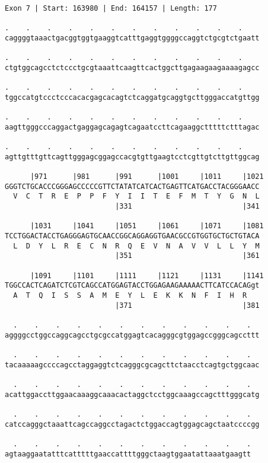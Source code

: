 \documentclass{article}
\begin{document}
\newpage
\begin{Verbatim}[fontfamily=courier]
Exon 7 | Start: 163980 | End: 164157 | Length: 177

.    .    .    .    .    .    .    .    .    .    .    .    
caggggtaaactgacggtggtgaaggtcatttgaggtggggccaggtctgcgtctgaatt

.    .    .    .    .    .    .    .    .    .    .    .    
ctgtggcagcctctccctgcgtaaattcaagttcactggcttgagaagaagaaaagagcc

.    .    .    .    .    .    .    .    .    .    .    .    
tggccatgtccctcccacacgagcacagtctcaggatgcaggtgcttgggaccatgttgg

.    .    .    .    .    .    .    .    .    .    .    .    
aagttgggcccaggactgaggagcagagtcagaatccttcagaaggctttttctttagac

.    .    .    .    .    .    .    .    .    .    .    .    
agttgtttgttcagttgggagcggagccacgtgttgaagtcctcgttgtcttgttggcag

      |971      |981      |991      |1001     |1011     |1021
GGGTCTGCACCCGGGAGCCCCCGTTCTATATCATCACTGAGTTCATGACCTACGGGAACC
  V  C  T  R  E  P  P  F  Y  I  I  T  E  F  M  T  Y  G  N  L
                          |331                          |341

      |1031     |1041     |1051     |1061     |1071     |1081
TCCTGGACTACCTGAGGGAGTGCAACCGGCAGGAGGTGAACGCCGTGGTGCTGCTGTACA
  L  D  Y  L  R  E  C  N  R  Q  E  V  N  A  V  V  L  L  Y  M
                          |351                          |361

      |1091     |1101     |1111     |1121     |1131     |1141
TGGCCACTCAGATCTCGTCAGCCATGGAGTACCTGGAGAAGAAAAACTTCATCCACAGgt
  A  T  Q  I  S  S  A  M  E  Y  L  E  K  K  N  F  I  H  R   
                          |371                          |381

  .    .    .    .    .    .    .    .    .    .    .    .  
aggggcctggccaggcagcctgcgccatggagtcacagggcgtggagccgggcagccttt

  .    .    .    .    .    .    .    .    .    .    .    .  
tacaaaaagccccagcctaggaggtctcagggcgcagcttctaacctcagtgctggcaac

  .    .    .    .    .    .    .    .    .    .    .    .  
acattggaccttggaacaaaggcaaacactaggctcctggcaaagccagctttgggcatg

  .    .    .    .    .    .    .    .    .    .    .    .  
catccagggctaaattcagccaggcctagactctggaccagtggagcagctaatccccgg

  .    .    .    .    .    .    .    .    .    .    .    .
agtaaggaatatttcatttttgaaccattttgggctaagtggaatattaaatgaagtt
\end{Verbatim}
\end{document}
